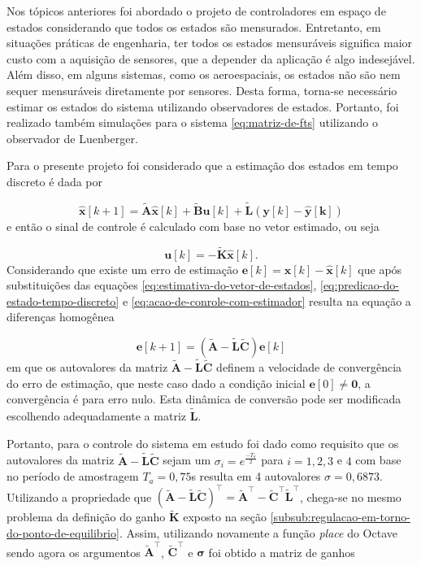 Nos tópicos anteriores foi abordado o projeto de controladores em espaço de
estados considerando que todos os estados são mensurados. Entretanto, em
situações práticas de engenharia, ter todos os estados mensuráveis significa
maior custo com a aquisição de sensores, que a depender da aplicação é algo
indesejável. Além disso, em alguns sistemas, como os aeroespaciais, os estados
não são nem sequer mensuráveis diretamente por sensores. Desta forma, torna-se
necessário estimar os estados do sistema utilizando observadores de estados.
Portanto, foi realizado também simulações para o sistema \ref{eq:matriz-de-fts}
utilizando o observador de Luenberger.

Para o presente projeto foi considerado que a estimação dos estados em tempo
discreto é dada por

\begin{equation}
    \label{eq:predicao-do-estado-tempo-discreto}
    \mathbf{\hat{x}}[k+1] = \mathbf{\tilde{A}}\mathbf{\hat{x}}[k]
                            + \mathbf{\tilde{B}}\mathbf{u}[k]
                            + \mathbf{\tilde{L}}(\mathbf{y}[k] - \mathbf{\hat{y}[k]})
\end{equation} e então o sinal de controle é calculado com base no
vetor estimado, ou seja

\begin{equation}
    \label{eq:acao-de-conrole-com-estimador}
    \mathbf{u}[k] = -\mathbf{\tilde{K}}\mathbf{\hat{x}}[k]\text{.}
\end{equation} Considerando que existe um erro de estimação
$\mathbf{e}[k] = \mathbf{x}[k] - \mathbf{\hat{x}}[k]$ que após substituições das
equações \ref{eq:estimativa-do-vetor-de-estados},
\ref{eq:predicao-do-estado-tempo-discreto} e
\ref{eq:acao-de-conrole-com-estimador} resulta na equação a diferenças homogênea

\begin{equation}
    \label{eq:erro-de-estimacao}
    \mathbf{e}[k+1] = (\mathbf{\tilde{A}}-\mathbf{\tilde{L}}\mathbf{\tilde{C}})\mathbf{e}[k]
\end{equation} em que os autovalores da matriz
$\mathbf{\tilde{A}}-\mathbf{\tilde{L}}\mathbf{\tilde{C}}$ definem a velocidade
de convergência do erro de estimação, que neste caso dado a condição inicial
$\mathbf{e}[0] \neq \mathbf{0}$, a convergência é para erro nulo. Esta dinâmica
de conversão pode ser modificada escolhendo adequadamente a matriz
$\mathbf{\tilde{L}}$.

Portanto, para o controle do sistema em estudo foi dado como requisito que os
autovalores da matriz $\mathbf{\tilde{A}}-\mathbf{\tilde{L}}\mathbf{\tilde{C}}$
sejam um $\sigma_i = e^{\frac{-T_a}{2}}$ para $i = 1, 2, 3$ e $4$ com base no
período de amostragem $T_a = 0,75$s resulta em 4 autovalores $\sigma = 0,6873$.
Utilizando a propriedade que
$(\mathbf{\tilde{A}}-\mathbf{\tilde{L}}\mathbf{\tilde{C}})^\top =
\mathbf{\tilde{A}}^\top - \mathbf{\tilde{C}}^\top\mathbf{\tilde{L}}^\top$,
chega-se no mesmo problema da definição do ganho $\mathbf{\tilde{K}}$ exposto na
seção \ref{subsub:regulacao-em-torno-do-ponto-de-equilibrio}. Assim, utilizando
novamente a função \textit{place} do Octave sendo agora os argumentos
$\mathbf{\tilde{A}}^\top$, $\mathbf{\tilde{C}}^\top$ e $\mathbf{\sigma}$ foi
obtido a matriz de ganhos

